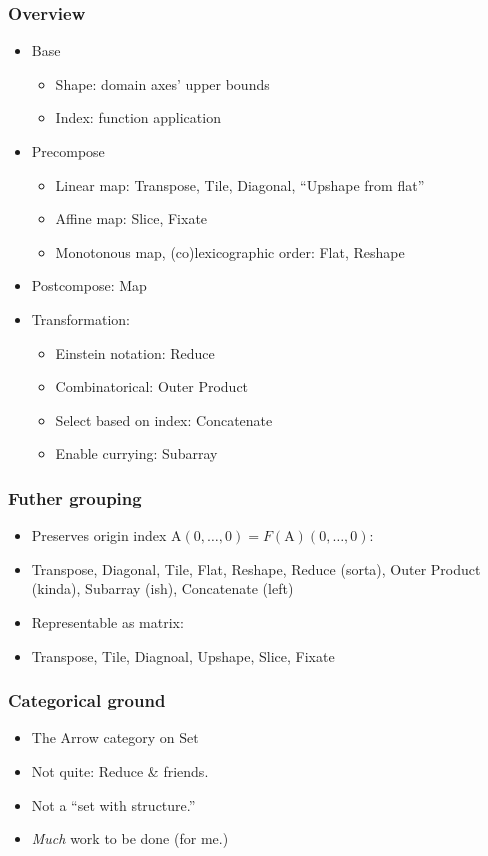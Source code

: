 \documentclass[xetex,mathserif,serif]{beamer}
\newcommand\mrm[1]{\mathrm{#1}}
\newcommand\brm[1]{\bm{\mrm{#1}}}
\begin{document}
\begin{frame}
  \frametitle{Overview}
  \pause
  \begin{itemize}[<+->]
    \item Base
      \begin{itemize}[<+->]
        \item Shape: domain axes' upper bounds
        \item Index: function application
      \end{itemize}
    \item Precompose
      \begin{itemize}[<+->]
        \item Linear map: Transpose, Tile, Diagonal, ``Upshape from flat''
        \item Affine map: Slice, Fixate
        \item Monotonous map, (co)lexicographic order: Flat, Reshape
      \end{itemize}
    \item Postcompose: Map
    \item Transformation:
      \begin{itemize}[<+->]
        \item Einstein notation: Reduce
        \item Combinatorical: Outer Product
        \item Select based on index: Concatenate
        \item Enable currying: Subarray
      \end{itemize}
  \end{itemize}
\end{frame}

\begin{frame}
  \frametitle{Futher grouping}
  \pause
  \begin{itemize}[<+->]
    \item Preserves origin index \(\brm A (0,\dots,0) = F(\brm A)(0,\dots,0)\):
    \item Transpose, Diagonal, Tile, Flat, Reshape, Reduce (sorta),
      Outer Product (kinda), Subarray (ish), Concatenate (left)
    \item Representable as matrix:
    \item Transpose, Tile, Diagnoal, Upshape, Slice, Fixate
  \end{itemize}
\end{frame}

\begin{frame}
  \frametitle{Categorical ground}
  \pause
  \begin{itemize}[<+->]
    \item The Arrow category on \(\brm{Set}\)
    \item Not quite: Reduce \& friends.
    \item Not a ``set with structure.''
    \item \emph{Much} work to be done (for me.)
  \end{itemize}
\end{frame}
\end{document}

